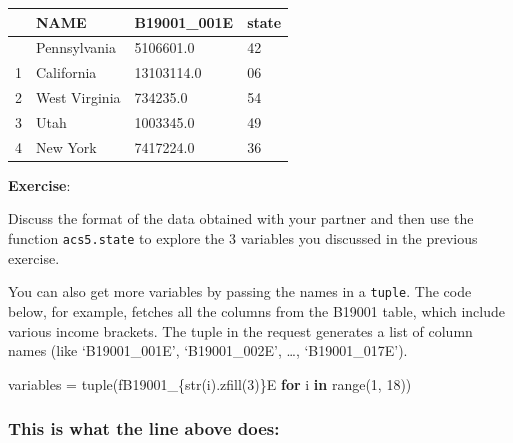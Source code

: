 \documentclass[
  letterpaper,
  DIV=11,
  numbers=noendperiod]{scrreprt}
\newenvironment{Shaded}{\begin{snugshade}}{\end{snugshade}}
\newcommand{\BuiltInTok}[1]{\textcolor[rgb]{0.00,0.23,0.31}{#1}}
\newcommand{\ControlFlowTok}[1]{\textcolor[rgb]{0.00,0.23,0.31}{\textbf{#1}}}
\newcommand{\DecValTok}[1]{\textcolor[rgb]{0.68,0.00,0.00}{#1}}
\newcommand{\KeywordTok}[1]{\textcolor[rgb]{0.00,0.23,0.31}{\textbf{#1}}}
\newcommand{\NormalTok}[1]{\textcolor[rgb]{0.00,0.23,0.31}{#1}}
\newcommand{\OperatorTok}[1]{\textcolor[rgb]{0.37,0.37,0.37}{#1}}
\newcommand{\SpecialCharTok}[1]{\textcolor[rgb]{0.37,0.37,0.37}{#1}}
\newcommand{\SpecialStringTok}[1]{\textcolor[rgb]{0.13,0.47,0.30}{#1}}
\begin{document}
\begin{longtable}[]{@{}llll@{}}
\toprule\noalign{}
& NAME & B19001\_001E & state \\
\midrule\noalign{}
\endhead
\bottomrule\noalign{}
\endlastfoot
0 & Pennsylvania & 5106601.0 & 42 \\
1 & California & 13103114.0 & 06 \\
2 & West Virginia & 734235.0 & 54 \\
3 & Utah & 1003345.0 & 49 \\
4 & New York & 7417224.0 & 36 \\
\end{longtable}

\textbf{Exercise}:

Discuss the format of the data obtained with your partner and then use
the function \texttt{acs5.state} to explore the 3 variables you
discussed in the previous exercise.

You can also get more variables by passing the names in a
\texttt{tuple}. The code below, for example, fetches all the columns
from the B19001 table, which include various income brackets. The tuple
in the request generates a list of column names (like `B19001\_001E',
`B19001\_002E', \ldots, `B19001\_017E').

\begin{Shaded}
\begin{Highlighting}[]
\NormalTok{variables }\OperatorTok{=} \BuiltInTok{tuple}\NormalTok{(}\SpecialStringTok{f\textquotesingle{}B19001\_}\SpecialCharTok{\{}\BuiltInTok{str}\NormalTok{(i)}\SpecialCharTok{.}\NormalTok{zfill(}\DecValTok{3}\NormalTok{)}\SpecialCharTok{\}}\SpecialStringTok{E\textquotesingle{}} \ControlFlowTok{for}\NormalTok{ i }\KeywordTok{in} \BuiltInTok{range}\NormalTok{(}\DecValTok{1}\NormalTok{, }\DecValTok{18}\NormalTok{))}
\end{Highlighting}
\end{Shaded}

\subsubsection{This is what the line above
does:}\label{this-is-what-the-line-above-does}
\end{document}
